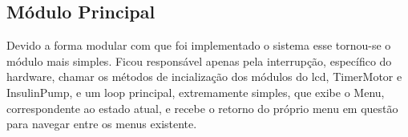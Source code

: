 \subsection{Módulo Principal}

Devido a forma modular com  que foi implementado o sistema esse tornou-se o módulo mais simples. Ficou responsável apenas pela interrupção, específico do hardware, chamar os métodos de incialização dos módulos do lcd, TimerMotor e InsulinPump, e um loop principal, extremamente simples, que exibe o Menu, correspondente ao estado atual, e recebe o retorno do próprio menu em questão para navegar entre os menus existente.